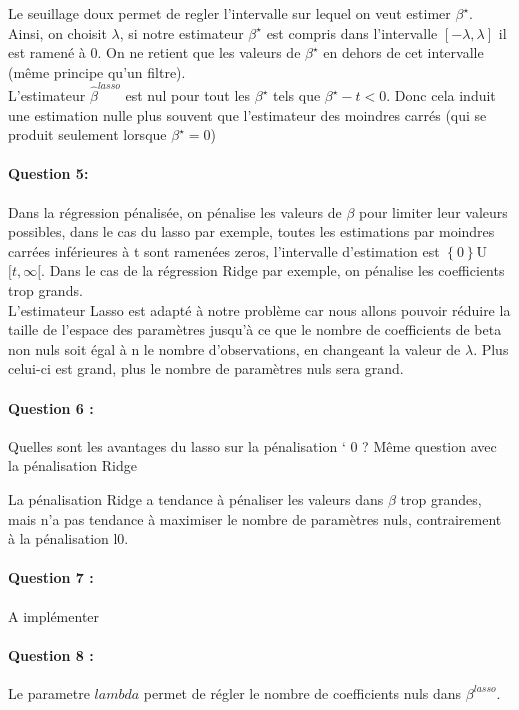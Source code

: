 \documentclass{article}
\begin{document}
Le seuillage doux permet de regler l'intervalle sur lequel on veut estimer $\beta^{\star}$. Ainsi, on choisit $\lambda$, si notre estimateur $\beta^{\star}$ est compris dans l'intervalle $[-\lambda,\lambda]$ il est ramené à 0. On ne retient que les valeurs de $\beta^{\star}$ en dehors de cet intervalle (même principe qu'un filtre).
\\L'estimateur $\hat{\beta}^{lasso}$ est nul pour tout les $\beta^{\star}$ tels que $\beta^{\star} - t < 0$. Donc cela induit une estimation nulle plus souvent que l'estimateur des moindres carrés (qui se produit seulement lorsque $\beta^{\star} = 0$)

\paragraph{Question 5:}
Dans la régression pénalisée, on pénalise les valeurs de $\beta$ pour limiter leur valeurs possibles, dans le cas du lasso par exemple, toutes les estimations par moindres carrées inférieures à t sont ramenées  zeros, l'intervalle d'estimation est $\left\lbrace0\right\rbrace$U$[t,\infty[$. Dans le cas de la régression Ridge par exemple, on pénalise les coefficients trop grands.
\\ L'estimateur Lasso est adapté à notre problème car nous allons pouvoir réduire la taille de l'espace des paramètres jusqu'à ce que le nombre de coefficients de beta non nuls soit égal à n le nombre d'observations, en changeant la valeur de $\lambda$. Plus celui-ci est grand, plus le nombre de paramètres nuls sera grand.



\paragraph{Question 6 :}
Quelles sont les avantages du lasso sur la pénalisation ` 0 ?
Même question avec la pénalisation Ridge

La pénalisation Ridge a tendance à pénaliser les valeurs dans $\beta$ trop grandes, mais n'a pas tendance à maximiser le nombre de paramètres nuls, contrairement à la pénalisation l0.

\paragraph{Question 7 :}
A implémenter

\paragraph{Question 8 :}
Le parametre $lambda$ permet de régler le nombre de coefficients nuls dans $\beta^{lasso}$.
\end{document}
